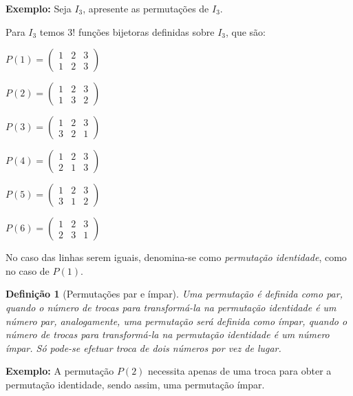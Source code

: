 \documentclass[oneside,a4paper,12pt]{article}
\newtheorem{definition}{Definição}[section]
\begin{document}
\textbf{Exemplo: } Seja $I_3$, apresente as permutações de $I_3$.

Para $I_3$ temos $3!$ funções bijetoras definidas sobre $I_3$, que são:
\begin{multicols}{3}
$
P(1)=
\left( 
\begin{array}{ccc}
1	&	2	&	3	\\
1	&	2	&	3
\end{array}
\right)
$

$
P(2)=
\left( 
\begin{array}{ccc}
1	&	2	&	3	\\
1	&	3	&	2
\end{array}
\right)
$

$
P(3)=
\left( 
\begin{array}{ccc}
1	&	2	&	3	\\
3	&	2	&	1
\end{array}
\right)
$

$
P(4)=
\left( 
\begin{array}{ccc}
1	&	2	&	3	\\
2	&	1	&	3
\end{array}
\right)
$

$
P(5)=
\left( 
\begin{array}{ccc}
1	&	2	&	3	\\
3	&	1	&	2
\end{array}
\right)
$

$
P(6)=
\left( 
\begin{array}{ccc}
1	&	2	&	3	\\
2	&	3	&	1
\end{array}
\right)
$

\end{multicols}

No caso das linhas serem iguais, denomina-se como {\it permutação identidade}, como no caso de $P(1)$.

\begin{definition}[Permutações par e ímpar]
	Uma permutação é definida como par, quando o número de trocas para transformá-la na permutação identidade é um número par, analogamente, uma permutação será definida como ímpar, quando o número de trocas para transformá-la na permutação identidade é um número ímpar. Só pode-se efetuar troca de dois números por vez de lugar.
\end{definition}

\textbf{Exemplo: } A permutação $P(2)$ necessita apenas de uma troca para obter a permutação identidade, sendo assim, uma permutação ímpar.
\end{document}
